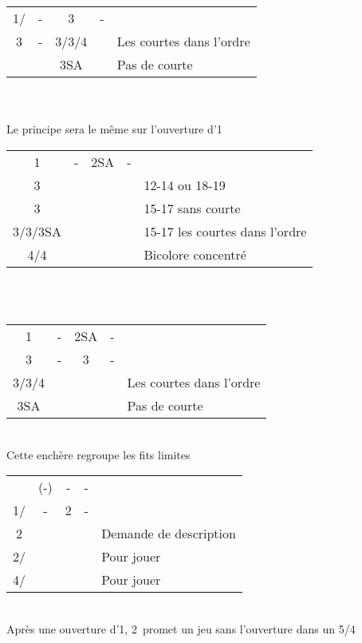 \documentclass[a4paper, oneside, 11pt]{report}
\begin{document}
		\begin{tabular}{cccc|l}
		1\coeur/\pique & - & 3\trefle & - &\\
		3\carreau & - & 3\coeur/3\pique/4\trefle && Les courtes dans l'ordre\\
		&& 3SA && Pas de courte\\
		\end{tabular}\\\\

		Le principe sera le même sur l'ouverture d'1\pique\\
		
		\begin{tabular}{cccc|l}
		1\coeur & - & 2SA & - &\\
		3\trefle &&&& 12-14 ou 18-19\\
		3\carreau &&&& 15-17 sans courte\\
		3\coeur/3\pique/3SA &&&& 15-17 les courtes dans l'ordre\\
		4\trefle/4\carreau &&&& Bicolore concentré\\
		\end{tabular}\\\\
		
		\begin{tabular}{cccc|l}
		1\coeur & - & 2SA & - &\\
		3\trefle & - & 3\carreau & - &\\
		3\coeur/3\pique/4\trefle &&&& Les courtes dans l'ordre\\
		3SA &&&& Pas de courte\\
		\end{tabular}\\
	
\newpage
		Cette enchère regroupe les fits limites\\
		\begin{tabular}{cccc|l}
		& (-) & - & - &\\
		1\coeur/\pique & - & 2\trefle & - &\\
		2\carreau &&&& Demande de description\\
		2\coeur/\pique &&&& Pour jouer\\
		4\coeur/\pique &&&& Pour jouer\\
		\end{tabular}\\
		Après une ouverture d'1\pique, 2\coeur\ promet un jeu sans l'ouverture dans un 5/4\\
\end{document}
